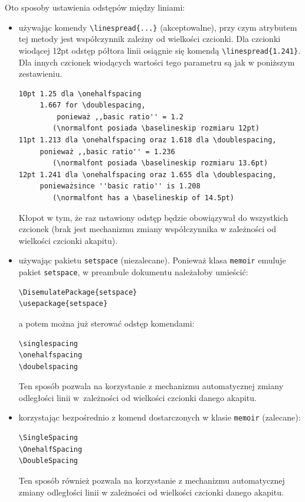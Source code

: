 Oto sposoby ustawienia odstępów między liniami:
\begin{itemize}
\item używając komendy \verb+\linespread{...}+ (akceptowalne), przy czym atrybutem tej metody jest współczynnik zależny od wielkości
czcionki.  Dla czcionki wiodącej 12pt odstęp półtora linii osiągnie się komendą \verb+\linespread{1.241}+. Dla innych czcionek wiodących wartości tego parametru są jak w poniższym zestawieniu.
\begin{lstlisting}[basicstyle=\footnotesize\ttfamily]
10pt 1.25 dla \onehalfspacing 
     1.667 for \doublespacing, 
		 ponieważ ,,basic ratio'' = 1.2 
		(\normalfont posiada \baselineskip rozmiaru 12pt)
11pt 1.213 dla \onehalfspacing oraz 1.618 dla \doublespacing, 
     ponieważ ,,basic ratio'' = 1.236 
		(\normalfont posiada \baselineskip rozmiaru 13.6pt)
12pt 1.241 dla \onehalfspacing oraz 1.655 dla \doublespacing, 
     ponieważsince ''basic ratio'' is 1.208 
		(\normalfont has a \baselineskip of 14.5pt)
\end{lstlisting}
Kłopot w tym, że raz ustawiony odstęp będzie obowiązywał do wszystkich czcionek (brak jest mechanizmu zmiany współczynnika w zależności od wielkości czcionki akapitu).

\item używając pakietu \texttt{setspace} (niezalecane). Ponieważ klasa \texttt{memoir} emuluje pakiet \texttt{setspace}, w preambule dokumentu należałoby umieścić:
\begin{lstlisting}[basicstyle=\footnotesize\ttfamily]
\DisemulatePackage{setspace}
\usepackage{setspace}
\end{lstlisting}
a potem można już sterować odstęp komendami:
\begin{lstlisting}[basicstyle=\footnotesize\ttfamily]
\singlespacing
\onehalfspacing
\doubelspacing
\end{lstlisting}
Ten sposób pozwala na korzystanie z mechanizmu automatycznej zmiany odległości linii w~zależności od wielkości czcionki danego akapitu.
\item korzystając bezpośrednio z komend dostarczonych w klasie \texttt{memoir} (zalecane):
\begin{lstlisting}[basicstyle=\footnotesize\ttfamily]
\SingleSpacing
\OnehalfSpacing
\DoubleSpacing
\end{lstlisting}
Ten sposób również pozwala na korzystanie z mechanizmu automatycznej zmiany odległości linii w zależności od wielkości czcionki danego akapitu.
\end{itemize}

